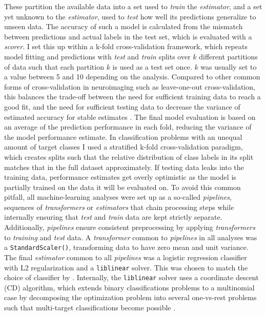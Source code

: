 These partition the available data into a set used to \textit{train} the \textit{estimator}, and a set yet unknown to the \textit{estimator}, used to \textit{test} how well its predictions generalize to unseen data.
The accuracy of such a model is calculated from the mismatch between predictions and actual labels in the test set, which is evaluated with a \textit{scorer}.
I set this up within a k-fold cross-validation framework, which repeats model fitting and predictions with \textit{test} and \textit{train} splits over $k$ different partitions of data such that each partition $k$ is used as a test set once.
$k$ was usually set to a value between 5 and 10 depending on the analysis.
Compared to other common forms of cross-validation in neuroimaging such as leave-one-out cross-validation, this balances the trade-off between the need for sufficient training data to reach a good fit, and the need for sufficient testing data to decrease the variance of estimated accuracy for stable estimates \citep{VAROQUAUX2017166}.
The final model evaluation is based on an average of the prediction performance in each fold, reducing the variance of the model performance estimate.
In classification problems with an unequal amount of target classes I used a stratified k-fold cross-validation paradigm, which creates splits such that the relative distribution of class labels in its split matches that in the full dataset approximately.
If testing data leaks into the training data, performance estimates get overly optimistic as the model is partially trained on the data it will be evaluated on.
To avoid this common pitfall, all machine-learning analyses were set up as a so-called \textit{pipelines}, sequences of \textit{transformers} or \textit{estimators} that chain processing steps while internally ensuring that \textit{test} and \textit{train} data are kept strictly separate.
Additionally, \textit{pipelines} ensure consistent preprocessing by applying \textit{transformers} to \textit{training} and \textit{test} data.
A \textit{transformer} common to \textit{pipelines} in all analyses was a \texttt{StandardScaler()}, transforming data to have zero mean and unit variance.
The final \textit{estimator} common to all \textit{pipelines} was a logistic regression classifier with L2 regularization and a \texttt{liblinear} solver.
This was chosen to match the choice of classifier by \citet{kaiserposter}.
Internally, the \texttt{liblinear} solver uses a coordinate descent (CD) algorithm, which extends binary classifications problems to a multinomial case by decomposing the optimization problem into several one-vs-rest problems such that multi-target classifications become possible \citep{scikit-learn-liblinear}.\\



